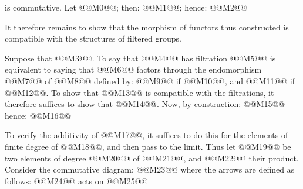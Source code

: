 is commutative. Let @@M0@@; then: @@M1@@; hence:
@@M2@@

It therefore remains to show that the morphism of functors thus constructed is compatible with the structures of filtered groups.

Suppose that @@M3@@. To say that @@M4@@ has filtration @@M5@@ is equivalent to saying that @@M6@@ factors through the endomorphism @@M7@@ of @@M8@@ defined by: @@M9@@ if @@M10@@, and @@M11@@ if @@M12@@.
To show that @@M13@@ is compatible with the filtrations, it therefore suffices to show that @@M14@@. Now, by construction:
@@M15@@
hence:
@@M16@@

To verify the additivity of @@M17@@, it suffices to do this for the elements of finite degree of @@M18@@, and then pass to the limit. Thus let @@M19@@ be two elements of degree @@M20@@ of @@M21@@, and @@M22@@ their product. Consider the commutative diagram:
@@M23@@
where the arrows are defined as follows: @@M24@@ acts on @@M25@@
